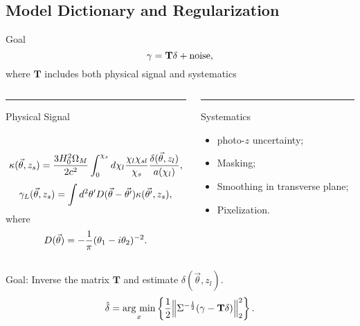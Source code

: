 \newcommand \figPathM{/home/xiangchong/.local/code/massMap_Private/doc/paper_ms_method_HSCY1/}
\newcommand \figPathMF{/home/xiangchong/.local/code/massMap_Private/doc/fig/}
\newcommand{\argmax}{\mathop{\rm arg~max}\limits}
\newcommand{\argmin}{\mathop{\rm arg~min}\limits}

\subsection{Model Dictionary and Regularization}
\begin{frame}{Goal}
\begin{equation} \notag
    \gamma=\mathbf{T} \delta+\rm{noise},
\end{equation}
where $\mathbf{T}$ includes both physical signal and systematics
\begin{columns}[t]
\begin{column}{0.5\textwidth}
{\color{blue}\rule{\linewidth}{4pt}
Physical Signal}\\
\begin{equation}\notag
\kappa(\vec{\theta},z_s)=\frac{3H_0^2\Omega_M}{2 c^2} \int_0^{\chi_s} d\chi_l \frac{\chi_l \chi_{sl}}{\chi_s}
\frac{\delta(\vec{\theta},z_l)}{a(\chi_l)},
\end{equation}
\begin{equation}\notag
\gamma_L(\vec{\theta},z_s) = \int  d^2 \theta' D(\vec{\theta}-\vec{\theta'}) \kappa(\vec{\theta'},z_s),
\end{equation}
where
\begin{equation}\notag
D(\vec{\theta})=-\frac{1}{\pi}(\theta_1-i\theta_2)^{-2}.
\end{equation}
\end{column}
\hfill
\begin{column}{0.5\textwidth}
{\color{red}\rule{\linewidth}{4pt}
Systematics}
\begin{itemize}
    \item photo-$z$ uncertainty;
    \item Masking;
    \item Smoothing in transverse plane;
    \item Pixelization.
\end{itemize}
\end{column}
\end{columns}
\alert{Goal: Inverse the matrix $\mathbf{T}$ and estimate $\delta(\vec{\theta},z_l)$.}
\begin{equation} \notag
\hat{\delta}=\argmin_{x} \left\{ \frac{1}{2}\norm{\Sigma^{-\frac{1}{2}}(\gamma-
\mathbf{T} \delta)}_2^2\right\}.
\end{equation}
\end{frame}

